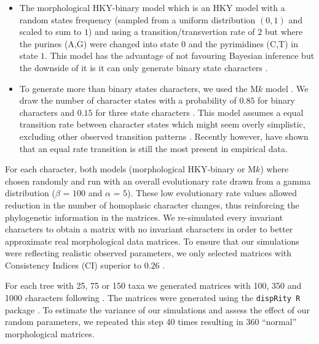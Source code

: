 \documentclass[12pt,letterpaper]{article}
\begin{document}
\begin{itemize}
    \item The morphological HKY-binary model \citep{OReilly20160081} which is an HKY model \citep{HKY85} with a random states frequency (sampled from a uniform distribution $(0,1)$ and scaled to sum to $1$)
     and using a transition/transvertion rate of $2$ \citep{douadycomparison2003} but where the purines (A,G) were changed into state $0$ and the pyrimidines (C,T) in state $1$.
    This model has the advantage of not favouring Bayesian inference \citep[since it doesn't use an M$k$ model;][; see discussion]{OReilly20160081} but the downside of it is it can only generate binary state characters \citep[or 4 states;][]{puttick2017uncertain}.
    \item To generate more than binary states characters, we used the M$k$ model \citep{lewisa2001}.
    We draw the number of character states with a probability of $0.85$ for binary characters and $0.15$ for three state characters \citep{Guillerme2016146,ZouConvergence}.
    This model assumes a equal transition rate between character states which might seem overly simplistic, excluding other observed transition patterns \citep[e.g. Dollo characters;][]{Dollo,wright2015came}.
    Recently however, \cite{Wright01072016} have shown that an equal rate transition is still the most present in empirical data.
\end{itemize}

\noindent For each character, both models (morphological HKY-binary or M$k$) where chosen randomly and run with an overall evolutionary rate drawn from a gamma distribution ($\beta$ = $100$ and $\alpha$ = $5$).
These low evolutionary rate values allowed reduction in the number of homoplasic character changes, thus reinforcing the phylogenetic information in the matrices.
We re-simulated every invariant characters to obtain a matrix with no invariant characters in order to better approximate real morphological data matrices.
To ensure that our simulations were reflecting realistic observed parameters, we only selected matrices with Consistency Indices (CI) superior to $0.26$ \citep{OReilly20160081}.

For each tree with 25, 75 or 150 taxa we generated matrices with 100, 350 and 1000 characters following \cite{OReilly20160081}.
The matrices were generated using the \texttt{dispRity R} package \citep{thomas_guillerme_2016_55646}.
To estimate the variance of our simulations and assess the effect of our random parameters, we repeated this step 40 times resulting in 360 ``normal'' morphological matrices.
\end{document}
